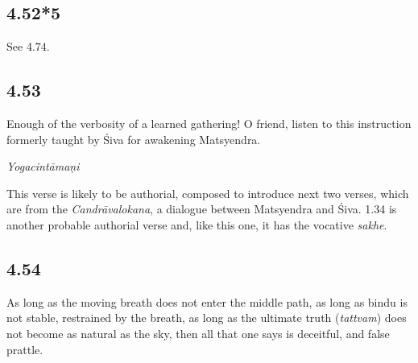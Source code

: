 \begin{ekdosis}
\subsection*{4.52*5}



\begin{philcomm}[hp04_052_5]
See 4.74.
\end{philcomm}

\subsection*{4.53}
\begin{translation}[hp04_053]
Enough of the verbosity of a learned gathering! O friend, listen to this instruction formerly taught by Śiva for awakening Matsyendra.

\end{translation}




\begin{testimonia}[hp04_053]
\emph{Yogacintāmaṇi}
\begin{versinnote}
\end{versinnote}
\end{testimonia}

\begin{philcomm}[hp04_053]
This verse is likely to be authorial, composed to introduce next two verses, which are from the \emph{Candrāvalokana}, a dialogue between Matsyendra and Śiva. 1.34 is another probable authorial verse and, like this one, it has the vocative \emph{sakhe}.
\end{philcomm}

\subsection*{4.54}
\begin{translation}[hp04_054]
As long as the moving breath does not enter the middle path, as long as bindu is not stable, restrained by the breath, as long as the ultimate truth (\emph{tattvam}) does not become as natural as the sky, then all that one says is deceitful, and false prattle.
\end{translation}


\end{ekdosis}
